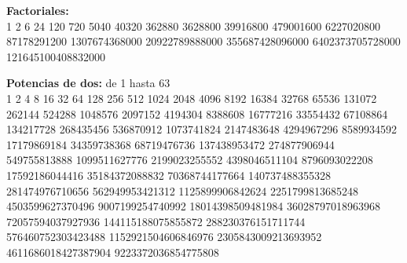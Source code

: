 \documentclass[10pt,landscape,twocolumn,a4paper,notitlepage]{article}
\begin{document}
	\vspace{8mm}
	\textbf{Factoriales:}\\
	\vspace{3mm}
	1 2 6 24 120 720 5040 40320 362880 3628800 39916800 479001600 6227020800 87178291200 1307674368000 20922789888000
	355687428096000 6402373705728000 121645100408832000
	
	\vspace{8mm}
	\textbf{Potencias de dos:} de 1 hasta 63\\
	\vspace{3mm}
	1 2 4 8 16 32 64 128 256 512 1024 2048 4096 8192 16384 32768 65536 131072 262144 524288 1048576 2097152 4194304 8388608
	16777216 33554432 67108864 134217728 268435456 536870912 1073741824 2147483648 4294967296 8589934592 17179869184
	34359738368 68719476736 137438953472 274877906944 549755813888 1099511627776 2199023255552 4398046511104 8796093022208
	17592186044416 35184372088832 70368744177664 140737488355328 281474976710656 562949953421312 1125899906842624
	2251799813685248 4503599627370496 9007199254740992 18014398509481984 36028797018963968 72057594037927936
	144115188075855872 288230376151711744 576460752303423488 1152921504606846976 2305843009213693952 4611686018427387904
	9223372036854775808
\end{document}
